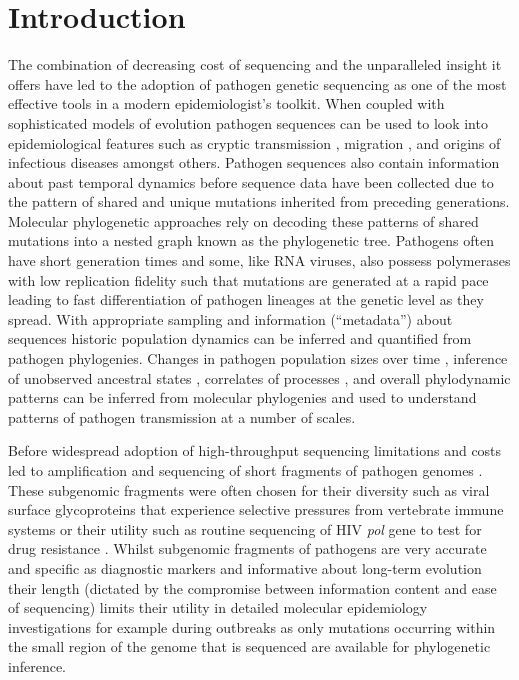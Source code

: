 \documentclass{bmcart}
\begin{document}
%
%
\section*{Introduction}

The combination of decreasing cost of sequencing and the unparalleled insight it offers have led to the adoption of pathogen genetic sequencing as one of the most effective tools in a modern epidemiologist's toolkit.
When coupled with sophisticated models of evolution pathogen sequences can be used to look into epidemiological features such as cryptic transmission \cite{faria_establishment_2017}, migration \cite{lemey_bayesian_2009,lemey_unifying_2014}, and origins \cite{smith_origins_2009} of infectious diseases amongst others.
Pathogen sequences also contain information about past temporal dynamics before sequence data have been collected \cite{raghwani_origin_2012} due to the pattern of shared and unique mutations inherited from preceding generations.
Molecular phylogenetic approaches rely on decoding these patterns of shared mutations into a nested graph known as the phylogenetic tree.
Pathogens often have short generation times and some, like RNA viruses, also possess polymerases with low replication fidelity such that mutations are generated at a rapid pace \cite{drummond_measurably_2003,biek_measurably_2015} leading to fast differentiation of pathogen lineages at the genetic level as they spread.
With appropriate sampling and information (``metadata'') about sequences historic population dynamics can be inferred and quantified from pathogen phylogenies.
Changes in pathogen population sizes over time \cite{pybus_integrated_2000}, inference of unobserved ancestral states \cite{dudas_mers-cov_2018}, correlates of processes \cite{faria_simultaneously_2013,dudas_virus_2017}, and overall phylodynamic \cite{grenfell_unifying_2004} patterns can be inferred from molecular phylogenies and used to understand patterns of pathogen transmission at a number of scales.

Before widespread adoption of high-throughput sequencing limitations and costs led to amplification and sequencing of short fragments of pathogen genomes \cite{jin_genetic_1999,jin_proposal_2005}.
These subgenomic fragments were often chosen for their diversity such as viral surface glycoproteins that experience selective pressures from vertebrate immune systems or their utility such as routine sequencing of HIV \textit{pol} gene to test for drug resistance \cite{kaye_phylogenetic_2008,rhee_human_2003}.
Whilst subgenomic fragments of pathogens are very accurate and specific as diagnostic markers and informative about long-term evolution their length (dictated by the compromise between information content and ease of sequencing) limits their utility in detailed molecular epidemiology investigations for example during outbreaks \cite{wohl_co-circulating_2018} as only mutations occurring within the small region of the genome that is sequenced are available for phylogenetic inference.
\end{document}
